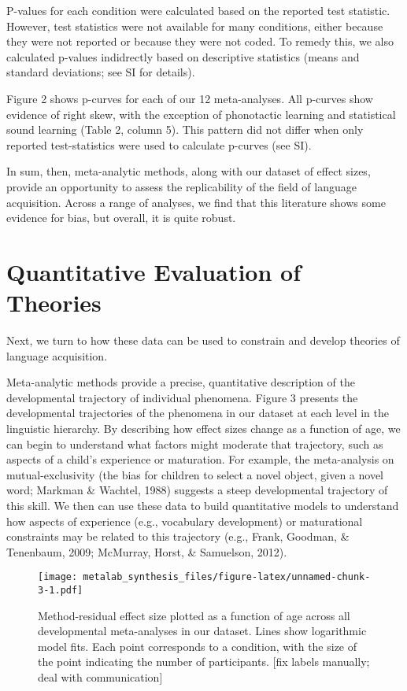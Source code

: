 \documentclass[english,floatsintext,man]{apa6}
\begin{document}
P-values for each condition were calculated based on the reported test
statistic. However, test statistics were not available for many
conditions, either because they were not reported or because they were
not coded. To remedy this, we also calculated p-values indidrectly based
on descriptive statistics (means and standard deviations; see SI for
details).

Figure 2 shows p-curves for each of our 12 meta-analyses. All p-curves
show evidence of right skew, with the exception of phonotactic learning
and statistical sound learning (Table 2, column 5). This pattern did not
differ when only reported test-statistics were used to calculate
p-curves (see SI).

In sum, then, meta-analytic methods, along with our dataset of effect
sizes, provide an opportunity to assess the replicability of the field
of language acquisition. Across a range of analyses, we find that this
literature shows some evidence for bias, but overall, it is quite
robust.

\section{Quantitative Evaluation of
Theories}\label{quantitative-evaluation-of-theories}

Next, we turn to how these data can be used to constrain and develop
theories of language acquisition.

Meta-analytic methods provide a precise, quantitative description of the
developmental trajectory of individual phenomena. Figure 3 presents the
developmental trajectories of the phenomena in our dataset at each level
in the linguistic hierarchy. By describing how effect sizes change as a
function of age, we can begin to understand what factors might moderate
that trajectory, such as aspects of a child's experience or maturation.
For example, the meta-analysis on mutual-exclusivity (the bias for
children to select a novel object, given a novel word; Markman \&
Wachtel, 1988) suggests a steep developmental trajectory of this skill.
We then can use these data to build quantitative models to understand
how aspects of experience (e.g., vocabulary development) or maturational
constraints may be related to this trajectory (e.g., Frank, Goodman, \&
Tenenbaum, 2009; McMurray, Horst, \& Samuelson, 2012).

\begin{figure}[htbp]
\centering
\texttt{[image: metalab\_synthesis\_files/figure-latex/unnamed-chunk-3-1.pdf]}
\caption{Method-residual effect size plotted as a function of age across
all developmental meta-analyses in our dataset. Lines show logarithmic
model fits. Each point corresponds to a condition, with the size of the
point indicating the number of participants. {[}fix labels manually;
deal with communication{]}}
\end{figure}
\end{document}

